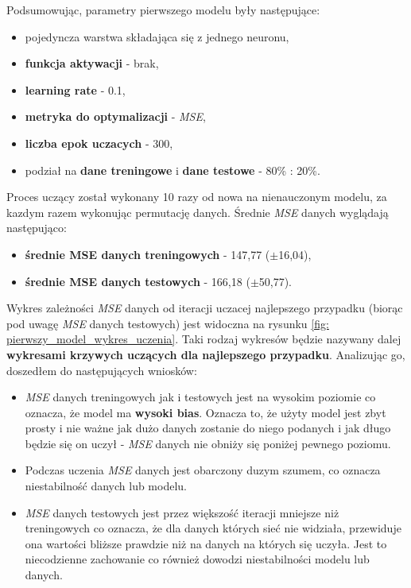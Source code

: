 \documentclass[12pt]{aghdpl}
\begin{document}
		Podsumowując, parametry pierwszego modelu były następujące:
		\begin{itemize}
		\item pojedyncza warstwa składająca się z jednego neuronu,
		\item \textbf{funkcja aktywacji} - brak,
		\item \textbf{learning rate} - 0.1,
		\item \textbf{metryka do optymalizacji} - \textit{MSE},
		\item \textbf{liczba epok uczacych} - 300,
		\item podział na \textbf{dane treningowe} i \textbf{dane testowe} - 80\% : 20\%.
		\end{itemize}
				
		Proces uczący został wykonany 10 razy od nowa na nienauczonym modelu, za kazdym razem wykonując permutację danych. Średnie \textit{MSE} danych wyglądają następująco:
		\begin{itemize}
		\item \textbf{średnie MSE danych treningowych} - 147,77 ($\pm$16,04),
		\item \textbf{średnie MSE danych testowych} - 166,18 ($\pm$50,77).
		\end{itemize}
		Wykres zależności \textit{MSE} danych od iteracji uczacej najlepszego przypadku (biorąc pod uwagę \textit{MSE} danych testowych) jest widoczna na rysunku \ref{fig: pierwszy_model_wykres_uczenia}. Taki rodzaj wykresów będzie nazywany dalej \textbf{wykresami krzywych uczących dla najlepszego przypadku}. Analizując go, doszedłem do następujących wniosków:
		\begin{itemize}
		\item \textit{MSE} danych treningowych jak i testowych jest na wysokim poziomie co oznacza, że model ma \textbf{wysoki bias}. Oznacza to, że użyty model jest zbyt prosty i nie ważne jak dużo danych zostanie do niego podanych i jak długo będzie się on uczył - \textit{MSE} danych nie obniży się poniżej pewnego poziomu.
		\item Podczas uczenia \textit{MSE} danych jest obarczony duzym szumem, co oznacza niestabilność danych lub modelu.
		\item \textit{MSE} danych testowych jest przez większość iteracji mniejsze niż treningowych co oznacza, że dla danych których sieć nie widziała, przewiduje ona wartości bliższe prawdzie niż na danych na których się uczyła. Jest to niecodzienne zachowanie co również dowodzi niestabilności modelu lub danych.
		\end{itemize}
		
\end{document}
